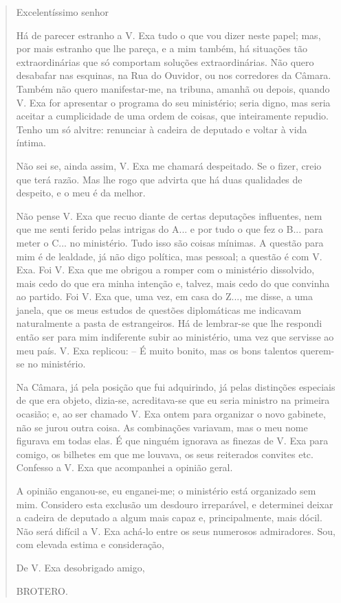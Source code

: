 \begin{quote}
Excelentíssimo senhor

Há de parecer estranho a V. Exa tudo o que vou dizer neste papel; mas,
por mais estranho que lhe pareça, e a mim também, há situações tão
extraordinárias que só comportam soluções extraordinárias. Não quero
desabafar nas esquinas, na Rua do Ouvidor, ou nos corredores da Câmara.
Também não quero manifestar-me, na tribuna, amanhã ou depois, quando V.
Exa for apresentar o programa do seu ministério; seria digno, mas seria
aceitar a cumplicidade de uma ordem de coisas, que inteiramente repudio.
Tenho um só alvitre: renunciar à cadeira de deputado e voltar à vida
íntima.

Não sei se, ainda assim, V. Exa me chamará despeitado. Se o fizer, creio
que terá razão. Mas lhe rogo que advirta que há duas qualidades de
despeito, e o meu é da melhor.

Não pense V. Exa que recuo diante de certas deputações influentes, nem
que me senti ferido pelas intrigas do A... e por tudo o que fez o B...
para meter o C... no ministério. Tudo isso são coisas mínimas. A questão
para mim é de lealdade, já não digo política, mas pessoal; a questão é
com V. Exa. Foi V. Exa que me obrigou a romper com o ministério
dissolvido, mais cedo do que era minha intenção e, talvez, mais cedo do
que convinha ao partido. Foi V. Exa que, uma vez, em casa do Z..., me
disse, a uma janela, que os meus estudos de questões diplomáticas me
indicavam naturalmente a pasta de estrangeiros. Há de lembrar-se que lhe
respondi então ser para mim indiferente subir ao ministério, uma vez que
servisse ao meu país. V. Exa replicou: -- É muito bonito, mas os bons
talentos querem-se no ministério.

Na Câmara, já pela posição que fui adquirindo, já pelas distinções
especiais de que era objeto, dizia-se, acreditava-se que eu seria
ministro na primeira ocasião; e, ao ser chamado V. Exa ontem para
organizar o novo gabinete, não se jurou outra coisa. As combinações
variavam, mas o meu nome figurava em todas elas. É que ninguém ignorava
as finezas de V. Exa para comigo, os bilhetes em que me louvava, os seus
reiterados convites etc. Confesso a V. Exa que acompanhei a opinião
geral.

A opinião enganou-se, eu enganei-me; o ministério está organizado sem
mim. Considero esta exclusão um desdouro irreparável, e determinei
deixar a cadeira de deputado a algum mais capaz e, principalmente, mais
dócil. Não será difícil a V. Exa achá-lo entre os seus numerosos
admiradores. Sou, com elevada estima e consideração,

De V. Exa desobrigado amigo,

BROTERO.
\end{quote}

